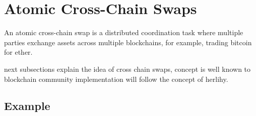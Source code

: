 



\clearpage

\section{Atomic Cross-Chain Swaps}
\label{sec:background:fifth_section}
An atomic cross-chain swap is a distributed coordination task where
multiple parties exchange assets across multiple blockchains, for
example, trading bitcoin for ether. \cite{weikum2001transactional}


next subsections explain the idea of cross chain swaps,
concept is well known to blockchain community 
implementation will follow the concept of herlihy.


\subsection{Example}
\label{subsec:background:second_section:example}


